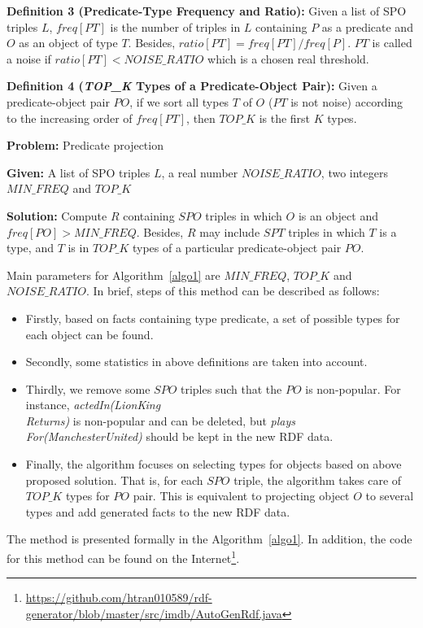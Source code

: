\documentclass{acm_proc_article-sp}
\begin{document}
\textbf{Definition 3 (Predicate-Type Frequency and Ratio):} Given a list of SPO triples $L$, $freq[PT]$ is the number of triples in $L$ containing $P$ as a predicate and $O$ as an object of type $T$. Besides, $ratio[PT] = freq[PT] / freq[P]$. $PT$ is called a noise if $ratio[PT] < NOISE\_RATIO$ which is a chosen real threshold.

\textbf{Definition 4 (\textit{TOP\_K} Types of a Predicate-Object Pair):} Given a predicate-object pair $PO$, if we sort all types $T$ of $O$ ($PT$ is not noise) according to the increasing order of $freq[PT]$, then $TOP\_K$ is the first $K$ types.

\begin{framed}
\textbf{Problem:} Predicate projection

\textbf{Given:} A list of SPO triples $L$, a real number $NOISE\_RATIO$, two integers $MIN\_FREQ$ and $TOP\_K$

\textbf{Solution:} Compute $R$ containing $SPO$ triples in which $O$ is an object and $freq[PO] > MIN\_FREQ$. Besides, $R$ may include $SPT$ triples in which $T$ is a type, and $T$ is in $TOP\_K$ types of a particular predicate-object pair $PO$.
\end{framed}

Main parameters for Algorithm~\ref{algo1} are $MIN\_FREQ$, $TOP\_K$ and $NOISE\_RATIO$. In brief, steps of this method can be described as follows:
\begin{itemize}
\item Firstly, based on facts containing type predicate, a set of possible types for each object can be found.
\item Secondly, some statistics in above definitions are taken into account.
\item Thirdly, we remove some $SPO$ triples such that the $PO$ is non-popular. For instance, \textit{actedIn(LionKing\\Returns)} is non-popular and can be deleted, but \textit{plays\\For(ManchesterUnited)} should be kept in the new RDF data.
\item Finally, the algorithm focuses on selecting types for objects based on above proposed solution. That is, for each $SPO$ triple, the algorithm takes care of $TOP\_K$ types for $PO$ pair. This is equivalent to projecting object $O$ to several types and add generated facts to the new RDF data.
\end{itemize}

The method is presented formally in the Algorithm~\ref{algo1}. In addition, the code for this method can be found on the Internet\footnote{\url{https://github.com/htran010589/rdf-generator/blob/master/src/imdb/AutoGenRdf.java}}.
\end{document}
